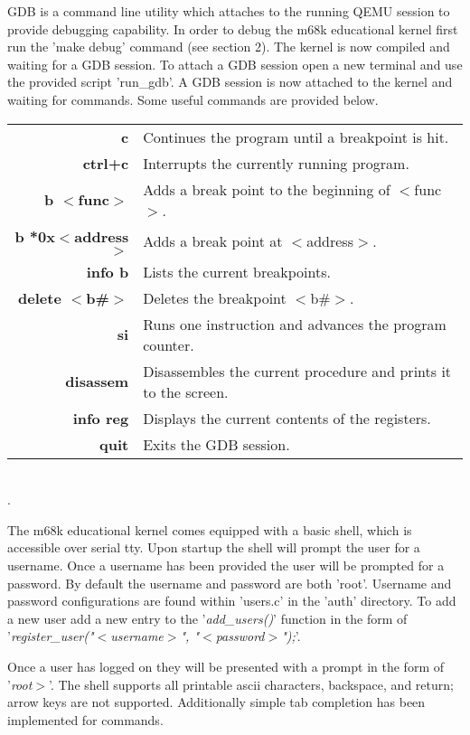 \documentclass{article}
\begin{document}

GDB is a command line utility which attaches to the running QEMU session to provide debugging capability. In order to debug the m68k educational kernel first run the 'make debug' command (see section 2). The kernel is now compiled and waiting for a GDB session. To attach a GDB session open a new terminal and use the provided script 'run\_gdb'. A GDB session is now attached to the kernel and waiting for commands. Some useful commands are provided below.\\

\begin{tabulary}{\textwidth}{r L}
\bf{c} & Continues the program until a breakpoint is hit.\\
\bf{ctrl+c} & Interrupts the currently running program.\\
\bf{b $<$func$>$} & Adds a break point to the beginning of $<$func$>$.\\
\bf{b *0x$<$address$>$} & Adds a break point at $<$address$>$.\\
\bf{info b} & Lists the current breakpoints.\\
\bf{delete $<$b\#$>$} & Deletes the breakpoint $<$b\#$>$.\\
\bf{si} & Runs one instruction and advances the program counter.\\
\bf{disassem} & Disassembles the current procedure and prints it to the screen.\\
\bf{info reg} & Displays the current contents of the registers.\\
\bf{quit} & Exits the GDB session.
\end{tabulary}\\
{\tiny.}\\
\newpage
{}

The m68k educational kernel comes equipped with a basic shell, which is accessible over serial tty. Upon startup the shell will prompt the user for a username. Once a username has been provided the user will be prompted for a password. By default the username and password are both 'root'. Username and password configurations are found within 'users.c' in the 'auth' directory. To add a new user add a new entry to the '\emph{add\_users()}' function in the form of '\emph{register\_user("$<$username$>$", "$<$password$>$");}'.

Once a user has logged on they will be presented with a prompt in the form of '\emph{root$>$}'. The shell supports all printable ascii characters, backspace, and return; arrow keys are not supported. Additionally simple tab completion has been implemented for commands.\\
\end{document}
